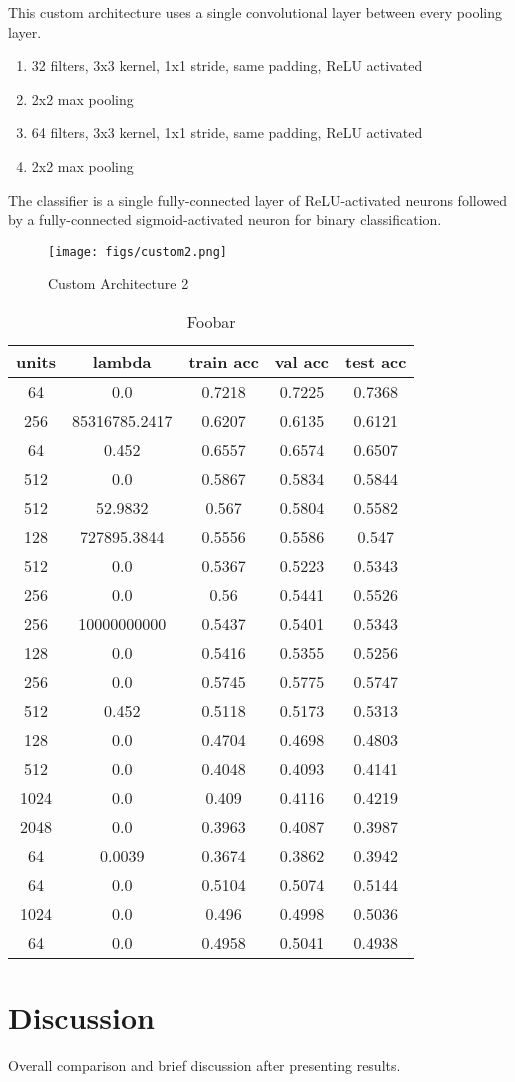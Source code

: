 This custom architecture uses a single convolutional layer between every pooling layer.

\begin{enumerate}
    \item 32 filters, 3x3 kernel, 1x1 stride, same padding, ReLU activated
    \item 2x2 max pooling
    \item 64 filters, 3x3 kernel, 1x1 stride, same padding, ReLU activated
    \item 2x2 max pooling
\end{enumerate}

The classifier is a single fully-connected layer of ReLU-activated neurons followed by a fully-connected sigmoid-activated neuron for binary classification.

\begin{figure}[h]
    \centering
    \texttt{[image: figs/custom2.png]}
    \caption{Custom Architecture 2}
    \label{fig:custom2}
\end{figure}


\begin{table}[ht]
\centering \begin{tabular}{ |c|c|c|c|c| }
\hline
units & lambda & train acc & val acc & test acc \\
\hline
64 & 0.0 & 0.7218 & 0.7225 & 0.7368 \\
256 & 85316785.2417 & 0.6207 & 0.6135 & 0.6121 \\
64 & 0.452 & 0.6557 & 0.6574 & 0.6507 \\
512 & 0.0 & 0.5867 & 0.5834 & 0.5844 \\
512 & 52.9832 & 0.567 & 0.5804 & 0.5582 \\
128 & 727895.3844 & 0.5556 & 0.5586 & 0.547 \\
512 & 0.0 & 0.5367 & 0.5223 & 0.5343 \\
256 & 0.0 & 0.56 & 0.5441 & 0.5526 \\
256 & 10000000000 & 0.5437 & 0.5401 & 0.5343 \\
128 & 0.0 & 0.5416 & 0.5355 & 0.5256 \\
256 & 0.0 & 0.5745 & 0.5775 & 0.5747 \\
512 & 0.452 & 0.5118 & 0.5173 & 0.5313 \\
128 & 0.0 & 0.4704 & 0.4698 & 0.4803 \\
512 & 0.0 & 0.4048 & 0.4093 & 0.4141 \\
1024 & 0.0 & 0.409 & 0.4116 & 0.4219 \\
2048 & 0.0 & 0.3963 & 0.4087 & 0.3987 \\
64 & 0.0039 & 0.3674 & 0.3862 & 0.3942 \\
64 & 0.0 & 0.5104 & 0.5074 & 0.5144 \\
1024 & 0.0 & 0.496 & 0.4998 & 0.5036 \\
64 & 0.0 & 0.4958 & 0.5041 & 0.4938 \\
\hline
\end{tabular}
\caption{Foobar}
\label{table:foobar}
\end{table}

\section{Discussion}
Overall comparison and brief discussion after presenting results.
